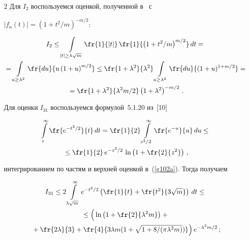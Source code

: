 \begin{multicols}{2}
Для $I_2$ воспользуемся оценкой, полученной в~\cite{1-cr}    с 


$|f_n(t)| = (1+ t^2/m)^{-m/2}$:


\begin{multline*}


I_2 \leq \int\limits_{|t|\geq \lambda\sqrt{m}} \fr{1}{|t|} \,\fr{1}{\left(1+t^2/m\right)^{m/2}}\,dt


={}\\


{}=  \int\limits_{u\geq \lambda^2} \fr{du}{u\left(1+u \right)^{m/2}}\leq


 \fr{1+\lambda^2}{\lambda^2}\int\limits_{u\geq \lambda^2} \fr{du}{(1+u )^{1+m/2}}={}\\


 {}= \fr{1+\lambda^2}{\lambda^2m/2}\left(1+\lambda^2 \right)^{-m/2}\,.


\end{multline*}


Для оценки   $I_{31}$ воспользуемся формулой~5.1.20 из~[10]


\begin{multline*} 


\int\limits_z^{\infty} \fr{e^{-t^2/2}}{t}\,dt= \fr{1}{2}\int\limits_{z^2/2}^{\infty}\fr{e^{-u}}{u}\, du \leq{}\\


{}\leq


\fr{1}{2}\, e^{-z^2/2}\,\ln\left(1+\fr{2}{z^2}\right) \,,


\end{multline*}


интегрированием по частям и верхней оценкой в~(\ref{g102a}). Тогда получаем


\begin{multline*} 


I_{31} \leq 2\int\limits_{\lambda\sqrt{m}}^{\infty} e^{-t^2/2}


\left(\fr{1}{t} + \fr{t^2}{3\sqrt{m}} \right)\, dt \leq{}\\


{} \leq \left( 


\vphantom{\fr{4}{\sqrt{\lambda^2}}}


\ln\left(1+\fr{2}{\lambda^2m}\right)+ {}\right.\\


\left.{}+


\fr{2\lambda}{3}+\fr{4}{3\lambda m(1+\sqrt{1+8/(\pi \lambda^2 m)})}\right) e^{-\lambda^2m/2}\,;


\end{multline*}






\end{multicols}
